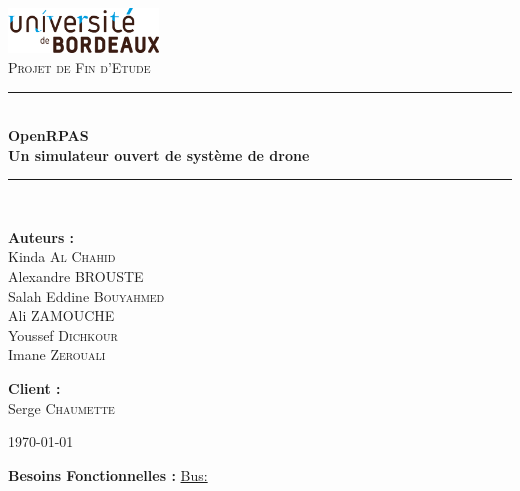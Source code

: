 \documentclass[12pt,a4paper]{article}
\newcommand{\HRule}{\rule{\linewidth}{0.5mm}}
\begin{document}
\begin{titlepage}
\begin{center}

\includegraphics[width=0.3\textwidth]{images/universite_bordeaux_logo.png}\\[1cm]    


\textsc{\Large Projet de Fin d'Etude}\\[0.5cm]

\vspace{30pt}
\HRule \\[0.4cm]
{ \huge \bfseries OpenRPAS
\\Un simulateur ouvert
de système de drone}\\[0.4cm]

\HRule \\[1.5cm]

\begin{minipage}{0.4\textwidth}
\begin{flushleft} \large
\textbf{Auteurs :}\\
Kinda \textsc{Al Chahid}\\
Alexandre \textsc{BROUSTE}\\
Salah Eddine  \textsc{Bouyahmed}\\
Ali  \textsc{ZAMOUCHE}\\
Youssef \textsc{Dichkour}\\
Imane \textsc{Zerouali}
\end{flushleft}
\end{minipage}
\begin{minipage}{0.4\textwidth}
\begin{flushright} \large
\textbf{Client :} \\
Serge \textsc{Chaumette}\\
\end{flushright}
\end{minipage}

\vfill

{\large \today}

\end{center}

\end{titlepage}



\textbf{Besoins Fonctionnelles :}
\newline
\underline{Bus:}\\
\newline
\end{document}
